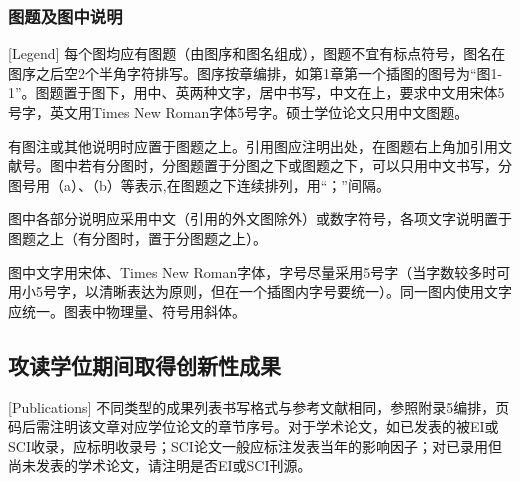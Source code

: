 





\subsubsection{图题及图中说明}[Legend]
每个图均应有图题（由图序和图名组成），图题不宜有标点符号，图名在图序之后空2个半角字符排写。图序按章编排，如第1章第一个插图的图号为“图1-1”。图题置于图下，用中、英两种文字，居中书写，中文在上，要求中文用宋体5号字，英文用Times New Roman字体5号字。硕士学位论文只用中文图题。

有图注或其他说明时应置于图题之上。引用图应注明出处，在图题右上角加引用文献号。图中若有分图时，分图题置于分图之下或图题之下，可以只用中文书写，分图号用（a）、（b）等表示,在图题之下连续排列，用“；”间隔。

图中各部分说明应采用中文（引用的外文图除外）或数字符号，各项文字说明置于图题之上（有分图时，置于分图题之上）。

图中文字用宋体、Times New Roman字体，字号尽量采用5号字（当字数较多时可用小5号字，以清晰表达为原则，但在一个插图内字号要统一）。同一图内使用文字应统一。图表中物理量、符号用斜体。







\subsection{攻读学位期间取得创新性成果}[Publications]
不同类型的成果列表书写格式与参考文献相同，参照附录5编排，页码后需注明该文章对应学位论文的章节序号。对于学术论文，如已发表的被EI或SCI收录，应标明收录号；SCI论文一般应标注发表当年的影响因子；对已录用但尚未发表的学术论文，请注明是否EI或SCI刊源。

